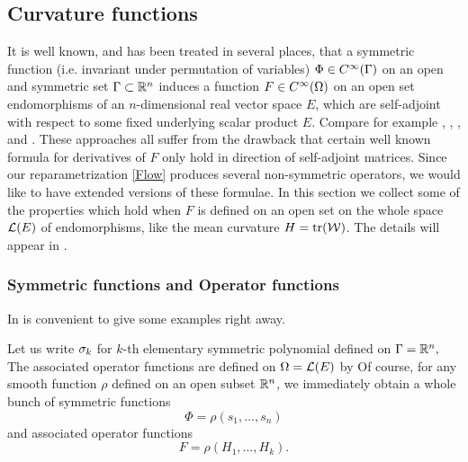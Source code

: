 \subsection*{Curvature functions}
It is well known, and has been treated in several places, that a symmetric function (i.e. invariant under permutation of variables) $\Phi\in C^{\infty}(\Gamma)$ on an open and symmetric set $\Gamma\subset\mathbb{R}^{n}$ induces a function $F\in C^{\infty}(\Omega)$ on an open set endomorphisms of an $n$-dimensional real vector space $E$, which are self-adjoint with respect to some fixed underlying scalar product $E$. Compare for example \cite{CaffarelliNirenbergSpruck:12/1985}, \cite{Andrews:/1994b}, \cite{Andrews:/2007}, and \cite{Gerhardt:/2006}. These approaches all suffer from the drawback that certain well known formula for derivatives of $F$ only hold in direction of self-adjoint matrices. Since our reparametrization \eqref{Flow} produces several non-symmetric operators, we would like to have extended versions of these formulae. In this section we collect some of the properties which hold when $F$ is defined on an open set on the whole space $\mathcal{L}(E)$ of endomorphisms, like the mean curvature $H=\operatorname{tr}(\mathcal{W})$. The details will appear in \cite{Scheuer:/2017}.

\subsubsection*{Symmetric functions and Operator functions}

{}
 
In is convenient to give some examples right away.

\begin{example}
Let us write $\sigma_k$ for $k$-th elementary symmetric polynomial defined on $\Gamma=\mathbb{R}^{n},$
 The associated operator functions are defined on $\Omega=\mathcal{L}(E)$ by
Of course, for any smooth function $\rho$ defined on an open subset $\mathbb{R}^{n}$, we immediately obtain a whole bunch of symmetric functions
$$\Phi=\rho(s_{1},\dots,s_{n})$$
 and associated operator functions 
$$F=\rho(H_{1},\dots,H_{k}).$$
\end{example}

